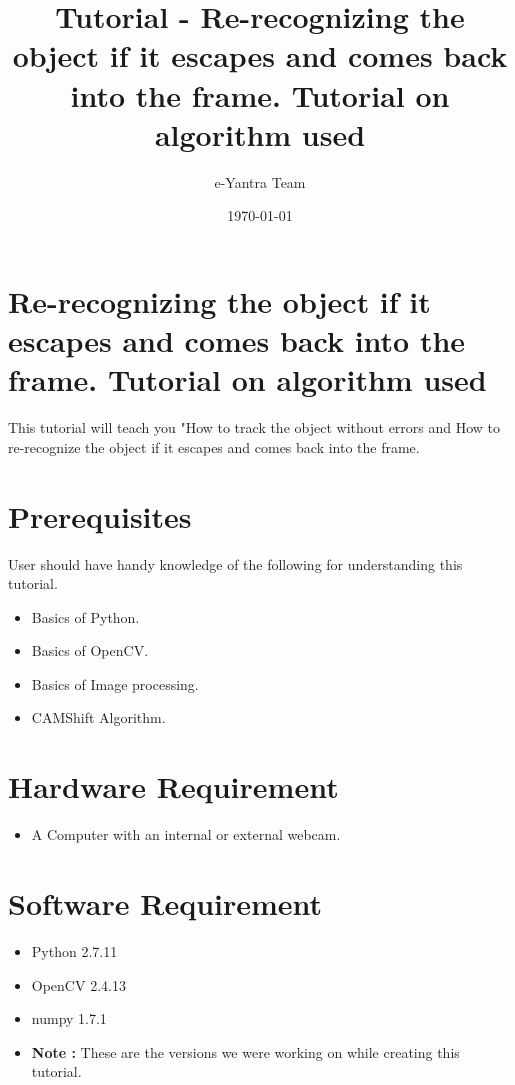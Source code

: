 \documentclass[11pt,a4paper]{article}
\title{Tutorial - Re-recognizing the object if it escapes and comes back into the frame. Tutorial on algorithm used}
\author{e-Yantra Team}
\date{\today}
\begin{document}
	\maketitle
	\newpage
	\tableofcontents
	\newpage
	\section{Re-recognizing the object if it escapes and comes back into the frame. Tutorial on algorithm used}
	This tutorial will teach you "How to track the object without errors and How to re-recognize the object if it escapes and comes back into the frame.
	\section{Prerequisites}
	User should have handy knowledge of the following for understanding this tutorial.
	\begin{itemize}
		\item Basics of Python.
		\item Basics of OpenCV.
		\item Basics of Image processing.
		\item CAMShift Algorithm.
	\end{itemize}
	\section{Hardware Requirement}
	\begin{itemize}
		\item A Computer with an internal or external webcam.
	\end{itemize}
	\section{Software Requirement}
	\begin{itemize}
		\item Python 2.7.11
		\item OpenCV 2.4.13 
		\item numpy 1.7.1
		\item \textbf{Note :} These are the versions we were working on while creating this tutorial.
	\end{itemize}
\end{document}
